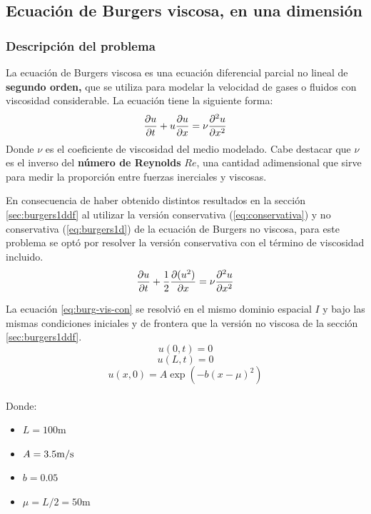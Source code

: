 \documentclass[12pt]{article}
\newcommand{\mpers}{\unit[per-mode = symbol]{\metre\per\second}}
\begin{document}
	\newpage
	\subsection{Ecuación de Burgers viscosa, en una dimensión}
	\label{sec:burg-vis1ddf}
	\subsubsection{Descripción del problema}
	La ecuación de Burgers viscosa es una ecuación diferencial parcial no lineal de \textbf{segundo orden,} que se utiliza para modelar la velocidad de gases o fluidos con viscosidad considerable. La ecuación tiene la siguiente forma:
	\begin{equation}
		\pdv{u}{t}+u\pdv{u}{x}=\nu \pdv{^2 u}{x^2}
		\label{eq:burg-vis}
	\end{equation}
	Donde $\nu$ es el coeficiente de viscosidad del medio modelado. Cabe destacar que $\nu$ es el inverso del \textbf{número de Reynolds} $Re$, una cantidad adimensional que sirve para medir la proporción entre fuerzas inerciales y viscosas. 

	En consecuencia de haber obtenido distintos resultados en la sección \ref{sec:burgers1ddf} al utilizar la versión conservativa (\ref{eq:conservativa}) y no conservativa (\ref{eq:burgers1d}) de la ecuación de Burgers no viscosa, para este problema se optó por resolver la versión conservativa con el término de viscosidad incluido.
	\begin{equation}
		\pdv{u}{t}+\frac{1}{2}\pdv{(u^2)}{x}=\nu \pdv{^2 u}{x^2}
		\label{eq:burg-vis-con}
	\end{equation}
	
 	La ecuación \ref{eq:burg-vis-con} se resolvió en el mismo dominio espacial $I$ y bajo las mismas condiciones iniciales y de frontera que la versión no viscosa de la sección \ref{sec:burgers1ddf}. 
 	\begin{equation}
 		u(0,t)=0
 	\end{equation}
 	\begin{equation}
 		u(L,t)= 0
 	\end{equation}
	\begin{equation}
		u(x,0) = A\exp(-b(x-\mu)^{2})
		\label{eq:condinicial-vis}
	\end{equation}
	\\
	Donde:
	\begin{itemize}
		\item $L = 100\unit{\meter}$
		\item $A=3.5\mpers$
		\item $b=0.05$
		\item $\mu=L/2=50\unit{\meter}$
	\end{itemize}
	
\end{document}
